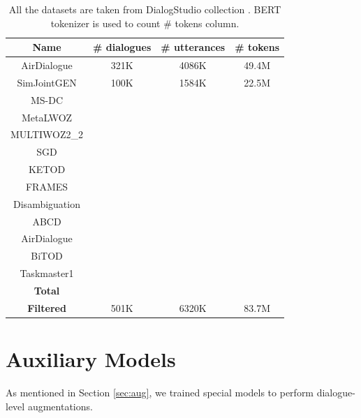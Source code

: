 \documentclass{article}
\begin{document}
\begin{table}[!htb]
    \centering
    \begin{tabular}{c|c|c|c}
        Name & \# dialogues & \# utterances & \# tokens \\
        \hline
        AirDialogue & 321K & 4086K & 49.4M \\
        SimJointGEN & 100K & 1584K & 22.5M \\
        MS-DC & & & \\
        MetaLWOZ & & & \\
        MULTIWOZ2\_2 & & & \\
        SGD & & & \\
        KETOD & & & \\
        FRAMES & & & \\
        Disambiguation & & & \\
        ABCD & & & \\
        AirDialogue & & & \\
        BiTOD & & & \\
        Taskmaster1 & & & \\
        \textbf{Total} & & & \\
        \textbf{Filtered} & 501K & 6320K & 83.7M
    \end{tabular}
    \caption{All the datasets are taken from DialogStudio collection \cite{zhang2023dialogstudio}. BERT tokenizer is used to count \# tokens column.}
    \label{tab:dataset}
\end{table}

\section{Auxiliary Models} \label{app:aug}

As mentioned in Section \ref{sec:aug}, we trained special models to perform dialogue-level augmentations.
\end{document}
